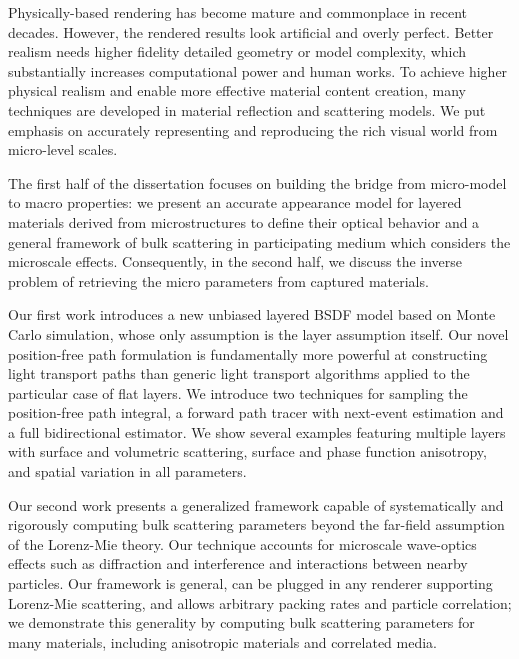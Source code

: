 \thesisabstract
{
  Physically-based rendering has become mature and commonplace in recent decades. However, the rendered results look artificial and overly perfect. Better realism needs higher fidelity detailed geometry or model complexity, which substantially increases computational power and human works. To achieve higher physical realism and enable more effective material content creation, many techniques are developed in material reflection and scattering models. We put emphasis on accurately representing and reproducing the rich visual world from micro-level scales.

  The first half of the dissertation focuses on building the bridge from micro-model to macro properties: we present an accurate appearance model for layered materials derived from microstructures to define their optical behavior and a general framework of bulk scattering in participating medium which considers the microscale effects. Consequently, in the second half, we discuss the inverse problem of retrieving the micro parameters from captured materials. 

  Our first work introduces a new unbiased layered BSDF model based on Monte Carlo simulation, whose only assumption is the layer assumption itself. Our novel position-free path formulation is fundamentally more powerful at constructing light transport paths than generic light transport algorithms applied to the particular case of flat layers. We introduce two techniques for sampling the position-free path integral, a forward path tracer with next-event estimation and a full bidirectional estimator. We show several examples featuring multiple layers with surface and volumetric scattering, surface and phase function anisotropy, and spatial variation in all parameters.

  Our second work presents a generalized framework capable of systematically and rigorously computing bulk scattering parameters beyond the far-field assumption of the Lorenz-Mie theory. Our technique accounts for microscale wave-optics effects such as diffraction and interference and interactions between nearby particles. Our framework is general, can be plugged in any renderer supporting Lorenz-Mie scattering, and allows arbitrary packing rates and particle correlation; we demonstrate this generality by computing bulk scattering parameters for many materials, including anisotropic materials and correlated media.

}
